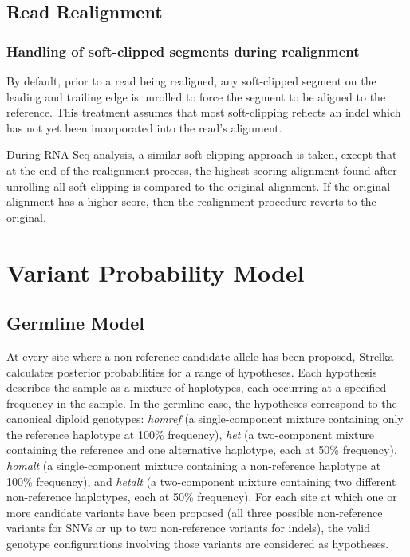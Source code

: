 \documentclass{article}
\begin{document}
\subsection{Read Realignment}
\label{sec:realignment}

\subsubsection{Handling of soft-clipped segments during realignment}

By default, prior to a read being realigned, any soft-clipped segment on the leading and trailing edge is unrolled to force the segment to be aligned to the reference. This treatment assumes that most soft-clipping reflects an indel which has not yet been incorporated into the read's alignment.

During RNA-Seq analysis, a similar soft-clipping approach is taken, except that at the end of the realignment process, the highest scoring alignment found after unrolling all soft-clipping is compared to the original alignment. If the original alignment has a higher score, then the realignment procedure reverts to the original.



\section{Variant Probability Model}
\subsection{Germline Model}
\label{sec:germline}
At every site where a non-reference candidate allele has been proposed, Strelka calculates posterior probabilities for a range of hypotheses. Each hypothesis describes the sample as a mixture of haplotypes, each occurring at a specified frequency in the sample. In the germline case, the hypotheses correspond to the canonical diploid genotypes: \emph{homref} (a single-component mixture containing only the reference haplotype at 100\% frequency), \emph{het} (a two-component mixture containing the reference and one alternative haplotype, each at 50\% frequency), \emph{homalt} (a single-component mixture containing a non-reference haplotype at 100\% frequency), and \emph{hetalt} (a two-component mixture containing two different non-reference haplotypes, each at 50\% frequency). For each site at which one or more candidate variants have been proposed (all three possible non-reference variants for SNVs or up to two non-reference variants for indels), the valid genotype configurations involving those variants are considered as hypotheses. 
\end{document}
